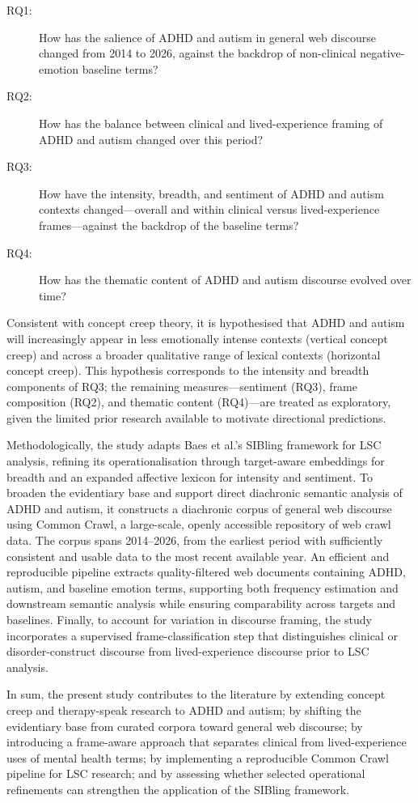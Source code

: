 \begin{description}
	\item[RQ1:] How has the salience of ADHD and autism in general web discourse changed from 2014 to 2026, against the backdrop of non-clinical negative-emotion baseline terms?
	\item[RQ2:] How has the balance between clinical and lived-experience framing of ADHD and autism changed over this period?
	\item[RQ3:] How have the intensity, breadth, and sentiment of ADHD and autism contexts changed---overall and within clinical versus lived-experience frames---against the backdrop of the baseline terms?
	\item[RQ4:] How has the thematic content of ADHD and autism discourse evolved over time?
\end{description}

Consistent with concept creep theory, it is hypothesised that ADHD and autism will increasingly appear in less emotionally intense contexts (vertical concept creep) and across a broader qualitative range of lexical contexts (horizontal concept creep). This hypothesis corresponds to the intensity and breadth components of RQ3; the remaining measures---sentiment (RQ3), frame composition (RQ2), and thematic content (RQ4)---are treated as exploratory, given the limited prior research available to motivate directional predictions.

Methodologically, the study adapts Baes et al.'s \citeyearpar{baesMultidimensionalFrameworkEvaluating2024} SIBling framework for LSC analysis, refining its operationalisation through target-aware embeddings for breadth and an expanded affective lexicon for intensity and sentiment. To broaden the evidentiary base and support direct diachronic semantic analysis of ADHD and autism, it constructs a diachronic corpus of general web discourse using Common Crawl, a large-scale, openly accessible repository of web crawl data. The corpus spans 2014--2026, from the earliest period with sufficiently consistent and usable data to the most recent available year. An efficient and reproducible pipeline extracts quality-filtered web documents containing ADHD, autism, and baseline emotion terms, supporting both frequency estimation and downstream semantic analysis while ensuring comparability across targets and baselines. Finally, to account for variation in discourse framing, the study incorporates a supervised frame-classification step that distinguishes clinical or disorder-construct discourse from lived-experience discourse prior to LSC analysis.

In sum, the present study contributes to the literature by extending concept creep and therapy-speak research to ADHD and autism; by shifting the evidentiary base from curated corpora toward general web discourse; by introducing a frame-aware approach that separates clinical from lived-experience uses of mental health terms; by implementing a reproducible Common Crawl pipeline for LSC research; and by assessing whether selected operational refinements can strengthen the application of the SIBling framework.
